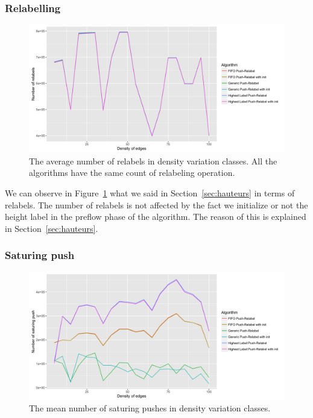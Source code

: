 \subsubsection{Relabelling}
\begin{figure}[H]
\begin{center}
\includegraphics[scale=0.15]{images/meanrelabels.png}
\caption{The average number of relabels in density variation classes. All the algorithms have the same count of relabeling operation.}
\label{fig:mean_relabel}
\end{center}
\end{figure}

We can observe in Figure~\ref{fig:mean_relabel} what we said in Section~\ref{sec:hauteurs} in terms of relabels. The number of relabels is not affected by the fact we initialize or not the height label in the preflow phase of the algorithm. The reason of this is explained in Section~\ref{sec:hauteurs}.

\subsubsection{Saturing push}
\begin{figure}[H]
\begin{center}
\includegraphics[scale=0.125]{images/meansaturingpushes.png}
\caption{The mean number of saturing pushes in density variation classes.}
\label{fig:mean_sat}
\end{center}
\end{figure}

